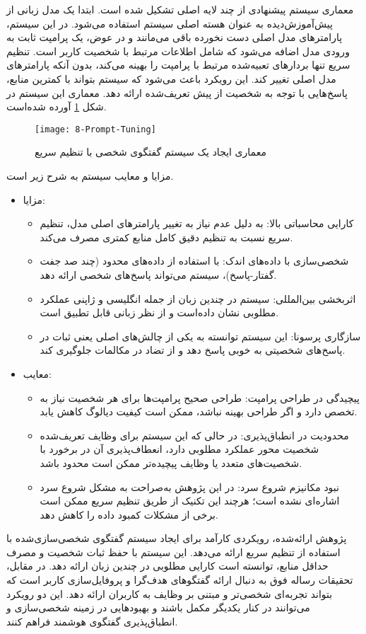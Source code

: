 \begin{enumerate}
معماری سیستم پیشنهادی%
\cite{kasahara2022building}
 از چند لایه اصلی تشکیل شده است. ابتدا یک مدل زبانی از پیش‌آموزش‌دیده به عنوان هسته اصلی سیستم استفاده می‌شود. در این سیستم، پارامترهای مدل اصلی دست نخورده باقی می‌مانند و در عوض، یک پرامپت ثابت به ورودی مدل اضافه می‌شود که شامل اطلاعات مرتبط با شخصیت کاربر است. تنظیم سریع تنها بردارهای تعبیه‌شده مرتبط با پرامپت را بهینه می‌کند، بدون آنکه پارامترهای مدل اصلی تغییر کند. این رویکرد باعث می‌شود که سیستم بتواند با کمترین منابع، پاسخ‌هایی با توجه به شخصیت از پیش تعریف‌شده ارائه دهد.
معماری این سیستم در شکل
\ref{fig:Prompt-Tuning}
آورده شده‌است.

\begin{figure}[ht]
	\centerline{\texttt{[image: 8-Prompt-Tuning]}}
		\caption{معماری ایجاد یک سیستم گفتگوی شخصی با تنظیم سریع 
			\cite{kasahara2022building}
	}
	\label{fig:Prompt-Tuning}
\end{figure}

مزایا و معایب سیستم به شرح زیر است.
\begin{itemize}
\item
مزایا:
\begin{itemize}
\item
کارایی محاسباتی بالا: به دلیل عدم نیاز به تغییر پارامترهای اصلی مدل، تنظیم سریع نسبت به تنظیم دقیق کامل منابع کمتری مصرف می‌کند.
\item
شخصی‌سازی با داده‌های اندک: با استفاده از داده‌های محدود (چند صد جفت گفتار-پاسخ)، سیستم می‌تواند پاسخ‌های شخصی ارائه دهد.
\item
اثربخشی بین‌المللی: سیستم در چندین زبان از جمله انگلیسی و ژاپنی عملکرد مطلوبی نشان داده‌است و از نظر زبانی قابل تطبیق است.
\item
سازگاری پرسونا: این سیستم توانسته به یکی از چالش‌های اصلی یعنی ثبات در پاسخ‌های شخصیتی به خوبی پاسخ دهد و از تضاد در مکالمات جلوگیری کند.
\end{itemize}


\item
معایب:
\begin{itemize}
\item
پیچیدگی در طراحی پرامپت: طراحی صحیح پرامپت‌ها برای هر شخصیت نیاز به تخصص دارد و اگر طراحی بهینه نباشد، ممکن است کیفیت دیالوگ کاهش یابد.
\item
محدودیت در انطباق‌پذیری: در حالی که این سیستم برای وظایف تعریف‌شده شخصیت محور عملکرد مطلوبی دارد، انعطاف‌پذیری آن در برخورد با شخصیت‌های متعدد یا وظایف پیچیده‌تر ممکن است محدود باشد.
\item
نبود مکانیزم شروع سرد: در این پژوهش به‌صراحت به مشکل شروع سرد اشاره‌ای نشده است؛ هرچند این تکنیک از طریق تنظیم سریع ممکن است برخی از مشکلات کمبود داده را کاهش دهد.
\end{itemize}
\end{itemize}
پژوهش ارائه‌شده، رویکردی کارآمد برای ایجاد سیستم گفتگوی شخصی‌سازی‌شده با استفاده از تنظیم سریع ارائه می‌دهد. این سیستم با حفظ ثبات شخصیت و مصرف حداقل منابع، توانسته است کارایی مطلوبی در چندین زبان ارائه دهد. در مقابل، تحقیقات رساله فوق به دنبال ارائه گفتگوهای هدف‌گرا و پروفایل‌سازی کاربر است که بتواند تجربه‌ای شخصی‌تر و مبتنی بر وظایف به کاربران ارائه دهد. این دو رویکرد می‌توانند در کنار یکدیگر مکمل باشند و بهبودهایی در زمینه شخصی‌سازی و انطباق‌پذیری گفتگوی هوشمند فراهم کنند.



\end{enumerate}
